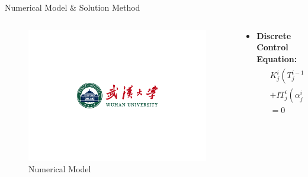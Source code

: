 \documentclass{beamer}
\begin{document}
\begin{frame}{Numerical Model \& Solution Method}
    \begin{columns}
        \begin{column}{.35\textwidth}
            \vfill
            \begin{figure}
                \includegraphics[scale=0.2]{pic/dark.pdf}
                \caption{Numerical Model}
                \label{fig4}
            \end{figure}
        \end{column}
        
        \begin{column}{.7\textwidth}
            \begin{itemize}
                \item \textbf{Discrete Control Equation:}
                {\small
                \begin{align}
                    \begin{aligned}
                        &K_j^i\left( {T_j^{i - 1} - T_j^i} \right) 
                        - K_j^{i + 1}\left( {T_j^i - T_j^{i + 1}} \right) \\ 
                        &+ IT_j^i\left( {\alpha _j^i - \alpha _j^{i + 1}} \right)+ \frac{1}{2}{I^2}\left( {R_j^i + R_j^{i + 1}} \right) \\ 
                        &= 0
                    \end{aligned}
                \end{align}
                }


\end{itemize}
\end{column}
\end{columns}
\end{frame}
\end{document}
